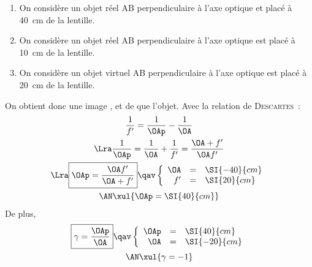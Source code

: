 \documentclass[a4paper, 10pt, garamond, oneside]{book}
\begin{document}
{	\begin{enumerate}
		\item On considère un objet réel AB perpendiculaire à l'axe optique et placé
		      à \SI{40}{cm} de la lentille.
		\item On considère un objet réel AB perpendiculaire à l'axe optique est
		      placé à \SI{10}{cm} de la lentille.
		\item On considère un objet virtuel AB perpendiculaire à l'axe optique est
		      placé à \SI{20}{cm} de la lentille.
	\end{enumerate}
}{
	\begin{enumerate}
		      \noindent
		      \begin{minipage}[t]{.48\linewidth}
			      On obtient donc une image ,  et de
			       que l'objet. Avec la relation de
			      \textsc{Descartes}~:
			      \begin{gather*}
				      \frac{1}{f'} =  \frac{1}{\OAp}-\frac{1}{\OA}
				      \\\Lra
				      \frac{1}{\OAp} = \frac{1}{\OA}+\frac{1}{f'}= \frac{\OA+f'}{\OA f'}
				      \\\Lra
				      \boxed{\OAp = \frac{\OA f'}{\OA+f'}}
				      \qav
				      \left\{
				      \begin{array}{rcl}
					      \OA & = & \SI{-40}{cm}
					      \\
					      f'  & = & \SI{20}{cm}
				      \end{array}
				      \right.\\
				      \AN
				      \xul{
					      \OAp = \SI{40}{cm}
				      }
			      \end{gather*}
			      De plus,
			      \begin{gather*}
				      \boxed{\gamma = \frac{\OAp}{\OA}}
				      \qav
				      \left\{
				      \begin{array}{rcl}
					      \OAp & = & \SI{40}{cm}
					      \\
					      \OA  & = & \SI{-20}{cm}
				      \end{array}
				      \right.\\
				      \AN
				      \xul{
					      \gamma = -1
				      }
			      \end{gather*}
		      \end{minipage}
		      \hfill
		      \begin{minipage}[t]{.48\linewidth}
			      ~
			      \begin{center}

\end{center}
\end{minipage}
\end{enumerate}}
\end{document}
